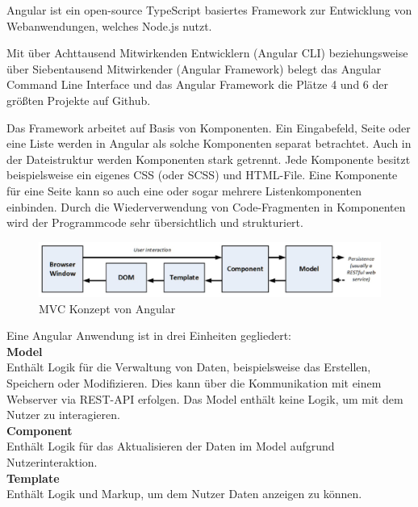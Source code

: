 Angular ist ein open-source TypeScript basiertes Framework zur Entwicklung von Webanwendungen, welches Node.js nutzt.


Mit über Achttausend Mitwirkenden Entwicklern (Angular CLI) beziehungsweise über Siebentausend Mitwirkender (Angular Framework) belegt das Angular Command Line Interface und das Angular Framework die Plätze 4 und 6 der größten Projekte auf Github. 
\cite{OctoverseGitHubStatistics}

Das Framework arbeitet auf Basis von Komponenten. Ein Eingabefeld, Seite oder eine Liste werden in Angular als solche Komponenten separat betrachtet. Auch in der Dateistruktur werden Komponenten stark getrennt. Jede Komponente besitzt beispielsweise ein eigenes CSS (oder SCSS) und HTML-File. Eine Komponente für eine Seite kann so auch eine oder sogar mehrere Listenkomponenten einbinden. Durch die Wiederverwendung von Code-Fragmenten in Komponenten wird der Programmcode sehr übersichtlich und strukturiert.

\begin{figure}[h]
        \includegraphics[width=\linewidth]{img/Angular_MVC.JPG}
        \centering
        \caption{MVC Konzept von Angular \cite[S. 35, Abbildung 3-4]{ProAngular}}
        \label{fig:angularmvc}
\end{figure}

Eine Angular Anwendung ist in drei Einheiten gegliedert:\\

\textbf{Model}\\ 
Enthält Logik für die Verwaltung von Daten, beispielsweise das Erstellen, Speichern oder Modifizieren. Dies kann über die Kommunikation mit einem Webserver via REST-API erfolgen. Das Model enthält keine Logik, um mit dem Nutzer zu interagieren.\\

\textbf{Component}\\
Enthält Logik für das Aktualisieren der Daten im Model aufgrund Nutzerinteraktion. \\

\textbf{Template}\\ 
Enthält Logik und Markup, um dem Nutzer Daten anzeigen zu können.

\cite{ProAngular}